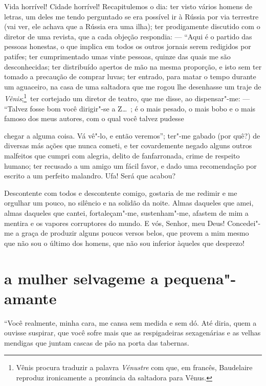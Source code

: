 Vida horrível! Cidade horrível! Recapitulemos o dia: ter visto vários
homens de letras, um deles me tendo perguntado se era possível
ir à Rússia por via terrestre (vai ver, ele achava que a Rússia era
uma ilha); ter prodigamente discutido com o diretor de uma revista,
que a cada objeção respondia: --- ``Aqui é o partido das
pessoas honestas, o que implica em todos os outros
jornais serem redigidos por patifes; ter cumprimentado umas vinte
pessoas, quinze das quais me são desconhecidas; ter distribuído
apertos de mão na mesma proporção, e isto sem ter tomado a precaução de
comprar luvas; ter entrado, para matar o tempo durante um aguaceiro,
na casa de uma saltadora que me rogou lhe desenhasse um traje de \textit{
Vênis};\protect\footnote{  Vênis procura traduzir a palavra \textit{Vénustre} com que, em francês,
Baudelaire reproduz ironicamente a pronúncia da saltadora para Vênus.}~ter cortejado um diretor de teatro, que me
disse, ao dispensar"-me: --- “Talvez fosse bom você
dirigir"-se a Z\ldots\ ; é o mais pesado, o mais bobo e o mais famoso dos
meus autores, com o qual você talvez pudesse 

\quebra

\noindent{}chegar a alguma coisa. Vá
vê"-lo, e então veremos''; ter"-me gabado (por
quê?) de diversas más ações que nunca cometi, e ter covardemente negado
alguns outros malfeitos que cumpri com alegria, delito de fanfarronada,
crime de respeito humano; ter recusado a um amigo um fácil favor, e
dado uma recomendação por escrito a um perfeito malandro. Ufa! Será que
acabou?

Descontente com todos e descontente comigo, gostaria de me redimir
e me orgulhar um pouco, no silêncio e na solidão da noite. Almas
daqueles que amei, almas daqueles que cantei, fortaleçam"-me,
sustenham"-me, afastem de mim a mentira e os vapores corruptores do
mundo. E vós, Senhor, meu Deus! Concedei"-me a graça de produzir alguns
poucos versos belos, que provem a mim mesmo que não sou o último dos
homens, que não sou inferior àqueles que desprezo!

\quebra\section[A mulher selvagem e a pequena"-amante]{a mulher selvagem\break e a pequena"-amante}

“Você realmente, minha cara, me cansa sem medida e
sem dó. Até diria, quem a ouvisse suspirar, que você sofre mais que
as respigadeiras sexagenárias e as velhas mendigas que juntam cascas de
pão na porta das tabernas.

